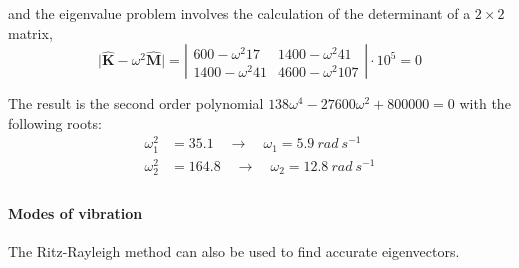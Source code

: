 \begin{Answer}[ref={three_storey_helicopter}]
and the eigenvalue problem involves the calculation of the determinant of a $2\times2$ matrix,
$$
\vert \hat{\mathbf{K}} - \omega^2 \hat{\mathbf{M}} \vert =
\left\vert \begin{matrix}
    600 -\omega^2 17 & 1400 -\omega^2 41 \\
    1400 -\omega^2 41 & 4600 -\omega^2 107
\end{matrix}
\right\vert \cdot 10^5 = 0
$$

The result is the second order polynomial
$
138 \omega^4 - 27600 \omega^2 + 800000 = 0
$ with the following roots:
\begin{align*}
\omega_1^2& = 35.1 \quad \rightarrow \quad \omega_1 = 5.9\ rad\ s^{-1} \\
\omega_2^2& = 164.8 \quad \rightarrow \quad \omega_2 = 12.8\ rad\ s^{-1} \\
\end{align*}


\paragraph{Modes of vibration} The Ritz-Rayleigh method can also be used to find accurate eigenvectors.
    
\end{Answer}
